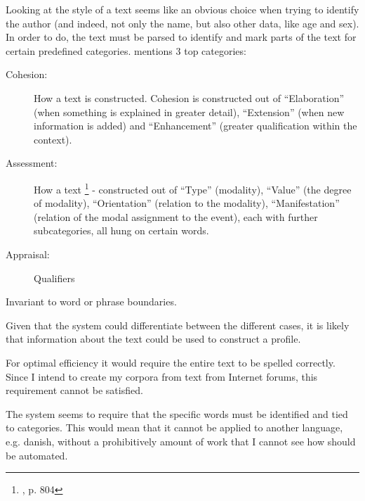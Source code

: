 {\label{stylistic}
Looking at the style of a text seems like an obvious choice when trying to identify the author (and indeed, not only the name, but also other data, like age and sex). In order to do, the text must be parsed to identify and mark parts of the text for certain predefined categories. \cite{style} mentions 3 top categories: 
\begin{description}
\item[Cohesion:] How a text is constructed. Cohesion is constructed out of  ``Elaboration'' (when something is explained in greater detail), ``Extension'' (when new information is added) and ``Enhancement'' (greater qualification within the context).
\item[Assessment:] How a text \footnote{\cite{style}, p. 804} - constructed out of  ``Type'' (modality), ``Value'' (the degree of modality), ``Orientation'' (relation to the modality), ``Manifestation'' (relation of the modal assignment to the event), each with further subcategories, all hung on certain words.
\item[Appraisal:] Qualifiers
\end{description}
}
{
}  
{
\item Invariant to word or phrase boundaries.
\item Given that the system could differentiate between the different cases, it is likely that information about the text could be used to construct a profile.
}{
\item For optimal efficiency it would require the entire text to be spelled correctly. Since I intend to create my corpora from text from Internet forums, this requirement cannot be satisfied.
\item The system seems to require that the specific words must be identified and tied to categories. This would mean that it cannot be applied to another language, e.g. danish,  without a prohibitively amount of work that I cannot see how should be automated.
} 

